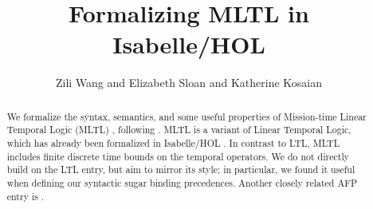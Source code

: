 \documentclass[11pt,a4paper]{article}
\begin{document}
\title{Formalizing MLTL in Isabelle/HOL}
\author{Zili Wang and Elizabeth Sloan and Katherine Kosaian}
\maketitle

\begin{abstract}
  We formalize the syntax, semantics, and some useful properties of Mission-time Linear Temporal Logic (MLTL) \cite{RRS14,LVR19}, following \cite{DBLP:conf/rv/LiR18,DBLP:conf/ifm/ElwingGSTWR23}.
  MLTL is a variant of Linear Temporal Logic, which has already been formalized in Isabelle/HOL \cite{LTL-AFP}.
  In contrast to LTL, MLTL includes finite discrete time bounds on the temporal operators.
  We do not directly build on the LTL entry, but aim to mirror its style; in particular, we found it useful when defining our syntactic sugar binding precedences.
  Another closely related AFP entry is \cite{MFOTL_Monitor-AFP}.
  
\end{abstract}

\tableofcontents





\end{document}
